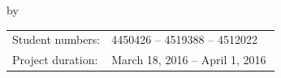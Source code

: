 \begin{titlepage}


\begin{center}


{\makeatletter
\largetitlestyle\fontsize{64}{94}\selectfont\@title
\makeatother}

{\makeatletter
\ifx\@subtitle\undefined\else
    \bigskip
   {\tudsffamily\fontsize{22}{32}\selectfont\@subtitle}    
\fi
\makeatother}

\bigskip
\bigskip

by

\bigskip
\bigskip

{\makeatletter
\titlestyle\fontsize{10}{10}\selectfont\@author
\makeatother}

\bigskip
\bigskip

% 
% 

\vfill

\begin{tabular}{lll}
    Student numbers: & 4450426 -- 4519388 -- 4512022 \\
    Project duration: & \multicolumn{2}{l}{March 18, 2016 -- April 1, 2016} \\
\end{tabular}




\end{center}
\end{titlepage}
